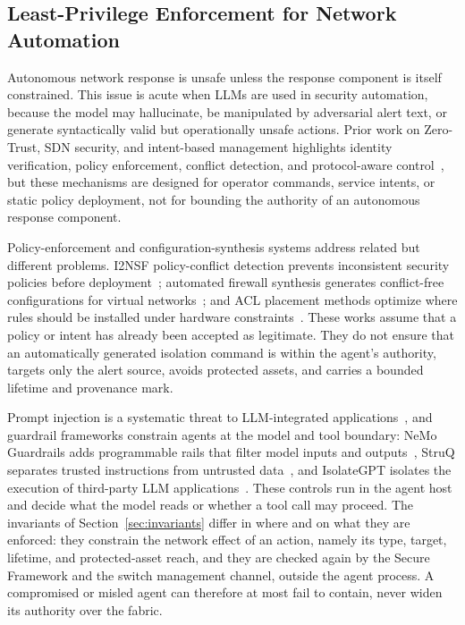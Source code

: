 \documentclass[final,5p]{elsarticle}
\begin{document}
\subsection{Least-Privilege Enforcement for Network Automation}
\label{sec:rw_enforcement}

Autonomous network response is unsafe unless the response component is itself constrained. This issue is acute when LLMs are used in security automation, because the model may hallucinate, be manipulated by adversarial alert text, or generate syntactically valid but operationally unsafe actions. Prior work on Zero-Trust, SDN security, and intent-based management highlights identity verification, policy enforcement, conflict detection, and protocol-aware control~\cite{rose2020zerotrust,metzger2023intentsecurity}, but these mechanisms are designed for operator commands, service intents, or static policy deployment, not for bounding the authority of an autonomous response component.

Policy-enforcement and configuration-synthesis systems address related but different problems. I2NSF policy-conflict detection prevents inconsistent security policies before deployment~\cite{nguyen2023i2nsf}; automated firewall synthesis generates conflict-free configurations for virtual networks~\cite{bringhenti2022firewall}; and ACL placement methods optimize where rules should be installed under hardware constraints~\cite{zahwa2025acl}. These works assume that a policy or intent has already been accepted as legitimate. They do not ensure that an automatically generated isolation command is within the agent's authority, targets only the alert source, avoids protected assets, and carries a bounded lifetime and provenance mark.

Prompt injection is a systematic threat to LLM-integrated applications~\cite{liu2024promptinjection}, and guardrail frameworks constrain agents at the model and tool boundary: NeMo Guardrails adds programmable rails that filter model inputs and outputs~\cite{rebedea2023nemo}, StruQ separates trusted instructions from untrusted data~\cite{chen2025struq}, and IsolateGPT isolates the execution of third-party LLM applications~\cite{wu2025isolategpt}. These controls run in the agent host and decide what the model reads or whether a tool call may proceed. The invariants of Section~\ref{sec:invariants} differ in where and on what they are enforced: they constrain the network effect of an action, namely its type, target, lifetime, and protected-asset reach, and they are checked again by the Secure Framework and the switch management channel, outside the agent process. A compromised or misled agent can therefore at most fail to contain, never widen its authority over the fabric.
\end{document}
